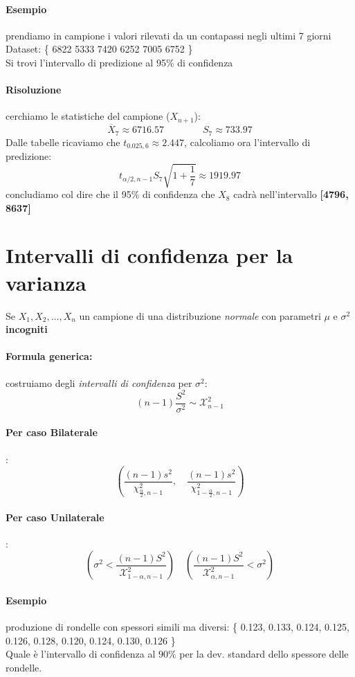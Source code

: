 \documentclass[]{article}
\newcommand{\formula}{\paragraph{Formula generica:}}
\begin{document}
    \paragraph{Esempio} prendiamo in campione i valori rilevati da un contapassi negli ultimi 7 giorni \\
    Dataset: \{ 6822 5333 7420 6252 7005 6752 \} \\
    Si trovi l'intervallo di predizione al 95\% di confidenza
    \paragraph{Risoluzione} cerchiamo le statistiche del campione ($X_{n+1}$):
    \[ \overline{X}_7 \approx 6716.57 \qquad \qquad S_7 \approx 733.97 \]
    Dalle tabelle ricaviamo che $t_{0.025,6} \approx 2.447$, calcoliamo ora l'intervallo di predizione:
    \[ t_{\alpha / 2, n-1} S_7 \sqrt{1 + \frac{1}{7}} \approx \boldsymbol{1919.97} \] 
    concludiamo col dire che il 95\% di confidenza che $X_8$ cadrà nell'intervallo \textbf{[4796, 8637]}
    \newpage
    \section{Intervalli di confidenza per la varianza} 
    Se $X_1, X_2, \ldots, X_n$ un campione di una distribuzione \textit{normale} con parametri $\mu$ e $\sigma^2$ \textbf{incogniti}
    \formula costruiamo degli \textit{intervalli di confidenza} per $\sigma^2$: 
    \[ (n-1) \frac{S^2}{\sigma^2} \sim \mathcal{X}^2_{n-1}  \]
    \paragraph{Per caso Bilaterale}:
    \begin{equation}
        \left(\frac{(n-1) s^2}{\chi_{\frac{\alpha}{2}, n-1}^2}, \quad \frac{(n-1) s^2}{\chi_{1-\frac{\alpha}{2}, n-1}^2}\right)
    \end{equation}
    \paragraph{Per caso Unilaterale}:
    \begin{equation}
        \left( \sigma^2  < \frac{(n-1)S^2}{\mathcal{X}^2_{1-\alpha, n-1}}\right) \quad \left( \frac{(n-1)S^2}{\mathcal{X}^2_{\alpha, n-1}} < \sigma^2 \right)
    \end{equation}
    \paragraph{Esempio} produzione di rondelle con spessori simili ma diversi: \{ 0.123, 0.133, 0.124, 0.125, 0.126, 0.128, 0.120, 0.124, 0.130, 0.126 \} \\
    Quale è l'intervallo di confidenza al $90\%$ per la dev. standard dello spessore delle rondelle.
\end{document}
